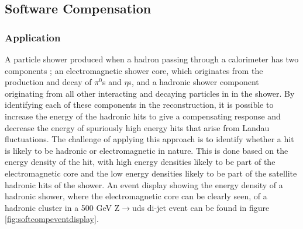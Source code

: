 
\subsection{Software Compensation}
\label{sec:softcomp}
\subsubsection{Application}
A particle shower produced when a hadron passing through a calorimeter has two components \cite{Wigmans:2000vf}; an electromagnetic shower core, which originates from the production and decay of $\pi^{0}$s and $\eta$s, and a hadronic shower component originating from all other interacting and decaying particles in in the shower.  By identifying each of these components in the reconstruction, it is possible to increase the energy of the hadronic hits to give a compensating response and decrease the energy of spuriously high energy hits that arise from Landau fluctuations.  The challenge of applying this approach is to identify whether a hit is likely to be hadronic or electromagnetic in nature.  This is done based on the energy density of the hit, with high energy densities likely to be part of the electromagnetic core and the low energy densities likely to be part of the satellite hadronic hits of the shower.  An event display showing the energy density of a hadronic shower, where the electromagnetic core can be clearly seen, of a hadronic cluster in a 500 GeV Z$\rightarrow$uds di-jet event can be found in figure \ref{fig:softcompeventdisplay}.  

